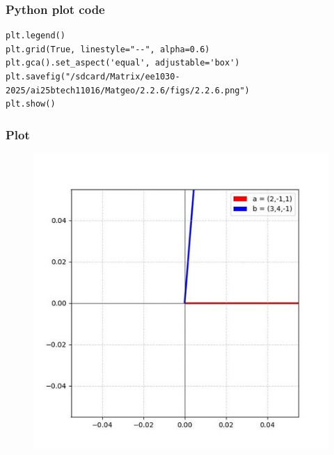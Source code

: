 \documentclass{beamer}
\begin{document}
\begin{frame}[fragile]
    \frametitle{Python plot code}
    \begin{lstlisting}
plt.legend()
plt.grid(True, linestyle="--", alpha=0.6)
plt.gca().set_aspect('equal', adjustable='box')
plt.savefig("/sdcard/Matrix/ee1030-2025/ai25btech11016/Matgeo/2.2.6/figs/2.2.6.png")
plt.show()

\end{lstlisting}
 
\end{frame}
\begin{frame}[fragile]
    \frametitle{Plot}
    
\begin{figure}[h]
    \centering
    \includegraphics[scale=0.5]{figs/2.2.6.jpg}
    \caption{}
    \label{fig:1}
\end{figure}


    
\end{frame}
\end{document}
